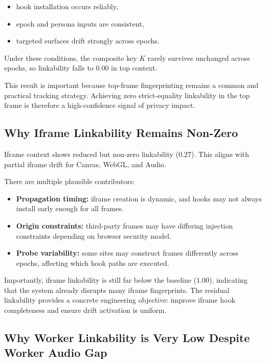 \documentclass[11pt]{report}
\begin{document}
\begin{itemize}
    \item hook installation occurs reliably,
    \item epoch and persona inputs are consistent,
    \item targeted surfaces drift strongly across epochs.
\end{itemize}

Under these conditions, the composite key $K$ rarely survives unchanged across epochs, so linkability falls to $0.00$ in top context.

This result is important because top-frame fingerprinting remains a common and practical tracking strategy. Achieving zero strict-equality linkability in the top frame is therefore a high-confidence signal of privacy impact.

\subsection{Why Iframe Linkability Remains Non-Zero}

Iframe context shows reduced but non-zero linkability ($0.27$). This aligns with partial iframe drift for Canvas, WebGL, and Audio.

There are multiple plausible contributors:

\begin{itemize}
    \item \textbf{Propagation timing:} iframe creation is dynamic, and hooks may not always install early enough for all frames.
    \item \textbf{Origin constraints:} third-party frames may have differing injection constraints depending on browser security model.
    \item \textbf{Probe variability:} some sites may construct frames differently across epochs, affecting which hook paths are executed.
\end{itemize}

Importantly, iframe linkability is still far below the baseline ($1.00$), indicating that the system already disrupts many iframe fingerprints. The residual linkability provides a concrete engineering objective: improve iframe hook completeness and ensure drift activation is uniform.

\subsection{Why Worker Linkability is Very Low Despite Worker Audio Gap}
\end{document}
